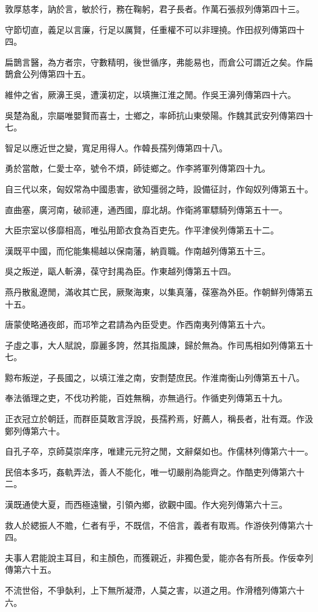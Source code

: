 敦厚慈孝，訥於言，敏於行，務在鞠躬，君子長者。作萬石張叔列傳第四十三。

守節切直，義足以言廉，行足以厲賢，任重權不可以非理撓。作田叔列傳第四十四。

扁鵲言醫，為方者宗，守數精明，後世循序，弗能易也，而倉公可謂近之矣。作扁鵲倉公列傳第四十五。

維仲之省，厥濞王吳，遭漢初定，以填撫江淮之閒。作吳王濞列傳第四十六。

吳楚為亂，宗屬唯嬰賢而喜士，士鄉之，率師抗山東滎陽。作魏其武安列傳第四十七。

智足以應近世之變，寬足用得人。作韓長孺列傳第四十八。

勇於當敵，仁愛士卒，號令不煩，師徒鄉之。作李將軍列傳第四十九。

自三代以來，匈奴常為中國患害，欲知彊弱之時，設備征討，作匈奴列傳第五十。

直曲塞，廣河南，破祁連，通西國，靡北胡。作衛將軍驃騎列傳第五十一。

大臣宗室以侈靡相高，唯弘用節衣食為百吏先。作平津侯列傳第五十二。

漢既平中國，而佗能集楊越以保南藩，納貢職。作南越列傳第五十三。

吳之叛逆，甌人斬濞，葆守封禺為臣。作東越列傳第五十四。

燕丹散亂遼閒，滿收其亡民，厥聚海東，以集真藩，葆塞為外臣。作朝鮮列傳第五十五。

唐蒙使略通夜郎，而邛笮之君請為內臣受吏。作西南夷列傳第五十六。

子虛之事，大人賦說，靡麗多誇，然其指風諫，歸於無為。作司馬相如列傳第五十七。

黥布叛逆，子長國之，以填江淮之南，安剽楚庶民。作淮南衡山列傳第五十八。

奉法循理之吏，不伐功矜能，百姓無稱，亦無過行。作循吏列傳第五十九。

正衣冠立於朝廷，而群臣莫敢言浮說，長孺矜焉，好薦人，稱長者，壯有溉。作汲鄭列傳第六十。

自孔子卒，京師莫崇庠序，唯建元元狩之閒，文辭粲如也。作儒林列傳第六十一。

民倍本多巧，姦軌弄法，善人不能化，唯一切嚴削為能齊之。作酷吏列傳第六十二。

漢既通使大夏，而西極遠蠻，引領內鄉，欲觀中國。作大宛列傳第六十三。

救人於緦振人不贍，仁者有乎，不既信，不倍言，義者有取焉。作游俠列傳第六十四。

夫事人君能說主耳目，和主顏色，而獲親近，非獨色愛，能亦各有所長。作佞幸列傳第六十五。

不流世俗，不爭埶利，上下無所凝滯，人莫之害，以道之用。作滑稽列傳第六十六。

